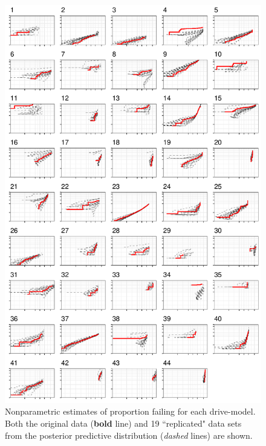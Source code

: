 \documentclass[12pt]{article}
\begin{document}
\begin{figure}[H]
\includegraphics[width=\textwidth,height=.9\textheight]{post-pred-KM-all}
\caption{Nonparametric estimates of proportion failing for each drive-model. Both the original data (\textbf{bold} line) and 19 ``replicated" data sets from the posterior predictive distribution (\textit{dashed} lines) are shown.}
\label{fig:post-pred-KM}
\end{figure}
\end{document}
